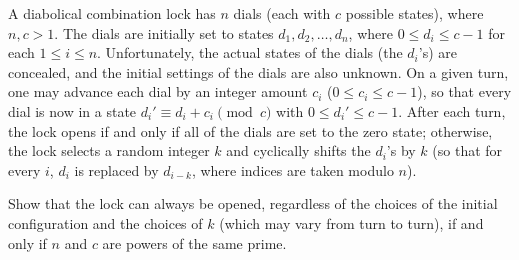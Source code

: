 A diabolical combination lock has $n$ dials (each with $c$ possible states), where $n,c>1$. The dials are initially set to states $d_1, d_2, \ldots, d_n$, where $0\le d_i\le c-1$ for each $1\le i\le n$. Unfortunately, the actual states of the dials (the $d_i$'s) are concealed, and the initial settings of the dials are also unknown. On a given turn, one may advance each dial by an integer amount $c_i$ ($0\le c_i\le c-1$), so that every dial is now in a state $d_i '\equiv d_i+c_i \pmod{c}$ with $0\le d_i ' \le c-1$. After each turn, the lock opens if and only if all of the dials are set to the zero state; otherwise, the lock selects a random integer $k$ and cyclically shifts the $d_i$'s by $k$ (so that for every $i$, $d_i$ is replaced by $d_{i-k}$, where indices are taken modulo $n$).

Show that the lock can always be opened, regardless of the choices of the initial configuration and the choices of $k$ (which may vary from turn to turn), if and only if $n$ and $c$ are powers of the same prime.